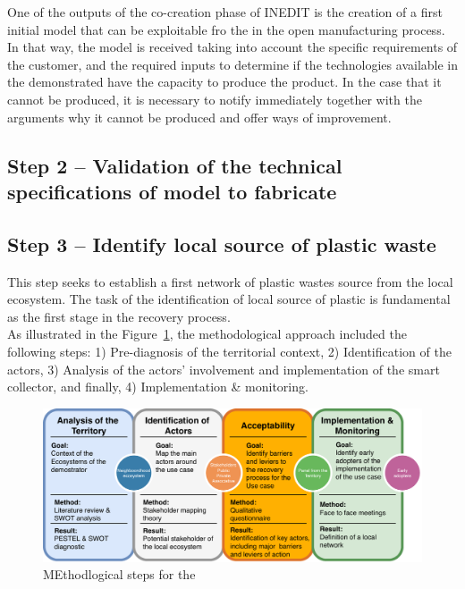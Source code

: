 \documentclass[
  11pt,
]{article}
\begin{document}
One of the outputs of the co-creation phase of INEDIT is the creation of
a first initial model that can be exploitable fro the in the open
manufacturing process. In that way, the model is received taking into
account the specific requirements of the customer, and the required
inputs to determine if the technologies available in the demonstrated
have the capacity to produce the product. In the case that it cannot be
produced, it is necessary to notify immediately together with the
arguments why it cannot be produced and offer ways of improvement.

\hypertarget{step-2-validation-of-the-technical-specifications-of-model-to-fabricate}{%
\subsection{Step 2 -- Validation of the technical specifications of
model to
fabricate}\label{step-2-validation-of-the-technical-specifications-of-model-to-fabricate}}

\hypertarget{step-3-identify-local-source-of-plastic-waste}{%
\subsection{Step 3 -- Identify local source of plastic
waste}\label{step-3-identify-local-source-of-plastic-waste}}

This step seeks to establish a first network of plastic wastes source
from the local ecosystem. The task of the identification of local source
of plastic is fundamental as the first stage in the recovery process.\\
As illustrated in the Figure~\ref{fig-fedoua-00}, the methodological
approach included the following steps: 1) Pre-diagnosis of the
territorial context, 2) Identification of the actors, 3) Analysis of the
actors' involvement and implementation of the smart collector, and
finally, 4) Implementation \& monitoring.

\begin{figure}

{\centering \includegraphics{figures/Fedoua-00.pdf}

}

\caption{\label{fig-fedoua-00}MEthodlogical steps for the}

\end{figure}
\end{document}
